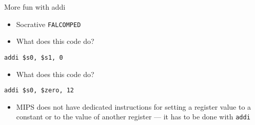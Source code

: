 \begin{frame}[fragile]{More fun with addi}
	\begin{itemize}
		\pause\item Socrative \texttt{FALCOMPED}
		\pause\item What does this code do?
	\end{itemize}
	\begin{lstlisting}
addi $s0, $s1, 0
	\end{lstlisting}
	\begin{itemize}
		\pause\item What does this code do?
	\end{itemize}
	\begin{lstlisting}
addi $s0, $zero, 12
	\end{lstlisting}
	\begin{itemize}
		\pause\item MIPS does not have dedicated instructions for setting a register value to a
			constant or to the value of another register --- it has to be done with \lstinline{addi}
	\end{itemize}
\end{frame}
